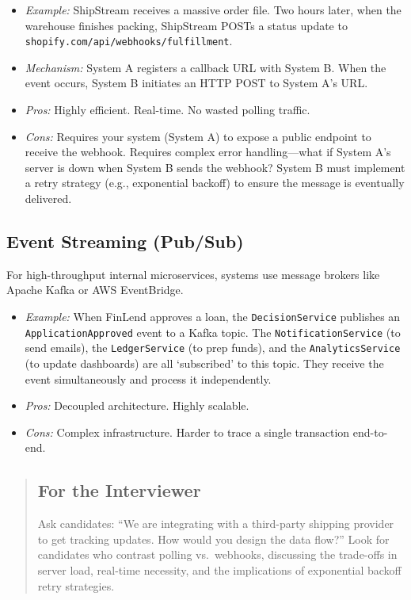 \begin{itemize}
\tightlist
\item
  \emph{Example:} ShipStream receives a massive order file. Two hours
  later, when the warehouse finishes packing, ShipStream POSTs a status
  update to \texttt{shopify.com/api/webhooks/fulfillment}.
\item
  \emph{Mechanism:} System A registers a callback URL with System B.
  When the event occurs, System B initiates an HTTP POST to System A's
  URL.
\item
  \emph{Pros:} Highly efficient. Real-time. No wasted polling traffic.
\item
  \emph{Cons:} Requires your system (System A) to expose a public
  endpoint to receive the webhook. Requires complex error
  handling---what if System A's server is down when System B sends the
  webhook? System B must implement a retry strategy (e.g., exponential
  backoff) to ensure the message is eventually delivered.
\end{itemize}

\subsection{Event Streaming (Pub/Sub)}\label{event-streaming-pubsub}

For high-throughput internal microservices, systems use message brokers
like Apache Kafka or AWS EventBridge.

\begin{itemize}
\tightlist
\item
  \emph{Example:} When FinLend approves a loan, the
  \texttt{DecisionService} publishes an \texttt{ApplicationApproved}
  event to a Kafka topic. The \texttt{NotificationService} (to send
  emails), the \texttt{LedgerService} (to prep funds), and the
  \texttt{AnalyticsService} (to update dashboards) are all `subscribed'
  to this topic. They receive the event simultaneously and process it
  independently.
\item
  \emph{Pros:} Decoupled architecture. Highly scalable.
\item
  \emph{Cons:} Complex infrastructure. Harder to trace a single
  transaction end-to-end.
\end{itemize}

\begin{quote}
\subsection{For the Interviewer}\label{for-the-interviewer}

Ask candidates: ``We are integrating with a third-party shipping
provider to get tracking updates. How would you design the data flow?''
Look for candidates who contrast polling vs.~webhooks, discussing the
trade-offs in server load, real-time necessity, and the implications of
exponential backoff retry strategies.
\end{quote}

